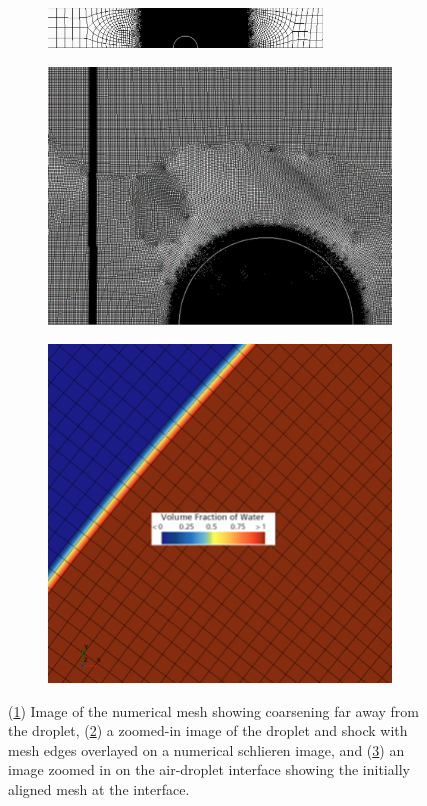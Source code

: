 \documentclass{UCF_ETD}
\begin{document}
\begin{figure}
\centering
    \begin{subfigure}[b]{\textwidth}
        \centering
        \includegraphics[width=0.8\textwidth]{Figures/mesh.png}
        \caption{}
        \label{subfig:mesh_zoomed_out}
    \end{subfigure}
        \begin{subfigure}[]{0.49\textwidth}
        \centering
        \includegraphics[width=\textwidth]{Figures/zoomed-in_mesh.png}
        \caption{}
        \label{subfig:mesh_shock}
    \end{subfigure}
        \begin{subfigure}[]{0.49\textwidth}
        \centering
        \includegraphics[scale=0.55]{Figures/mesh_alignment.png}
        \caption{}
        \label{subfig:mesh_alignment}
    \end{subfigure}
\caption{ (\ref{subfig:mesh_zoomed_out}) Image of the numerical mesh showing coarsening far away from the droplet, (\ref{subfig:mesh_shock}) a zoomed-in image of the droplet and shock with mesh edges overlayed on a numerical schlieren image, and (\ref{subfig:mesh_alignment}) an image zoomed in on the air-droplet interface showing the initially aligned mesh at the interface.}
\label{fig:mesh}
\end{figure}
\end{document}
